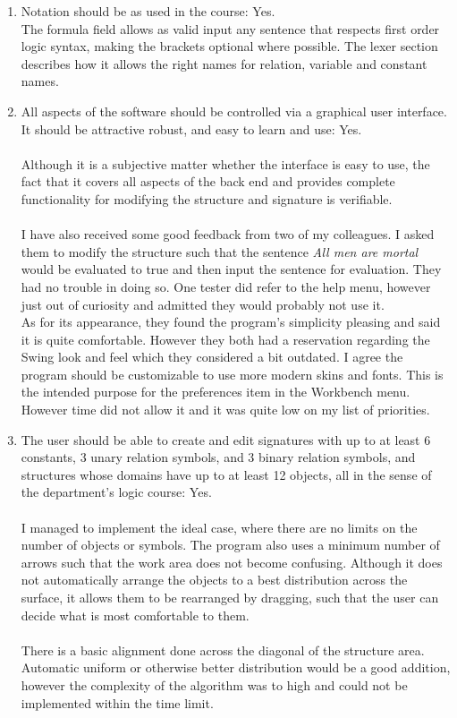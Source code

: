 \documentclass{report}
\begin{document}
\begin{enumerate}
\item Notation should be as used in the course: Yes.\\
The formula field allows as valid input any sentence that respects first order 
logic syntax, making the brackets optional where possible. The lexer section 
describes how it allows the right names for relation, variable and constant 
names.

\item All aspects of the software should be controlled via a graphical user 
interface. It should be attractive robust, and easy to learn and use: Yes.
\\ \\
Although it is a subjective matter whether the interface is easy to use, the 
fact that it covers all aspects of the back end and provides complete 
functionality for modifying the structure and signature is verifiable.
\\ \\
I have also received some good feedback from two of my colleagues. I asked them 
to modify the structure such that the sentence \emph{All men are mortal} would 
be evaluated to true and then input the sentence for evaluation. They had no 
trouble in doing so. One tester did refer to the help menu, however just out of 
curiosity and admitted they would probably not use it.\\ As for its appearance, 
they found the program's simplicity pleasing and said it is quite comfortable. 
However they both had a reservation regarding the Swing look and feel which they 
considered a bit outdated. I agree the program should be customizable to use 
more modern skins and fonts. This is the intended purpose for the preferences 
item in the Workbench menu. However time did not allow it and it was quite low 
on my list of priorities.

\item The user should be able to create and edit signatures with up to at least 
6 constants, 3 unary relation symbols, and 3 binary relation symbols, and 
structures whose domains have up to at least 12 objects, all in the sense of 
the department's logic course: Yes.
\\ \\
I managed to implement the ideal case, where there are no limits on the number 
of objects or symbols. The program also uses a minimum number of arrows such 
that the work area does not become confusing. Although it does not automatically 
arrange the objects to a best distribution across the surface, it allows them to 
be rearranged by dragging, such that the user can decide what is most 
comfortable to them.
\\ \\
There is a basic alignment done across the diagonal of the structure area. 
Automatic uniform or otherwise better distribution would be a good addition, 
however the complexity of the algorithm was to high and could not be implemented 
within the time limit.


\end{enumerate}
\end{document}
